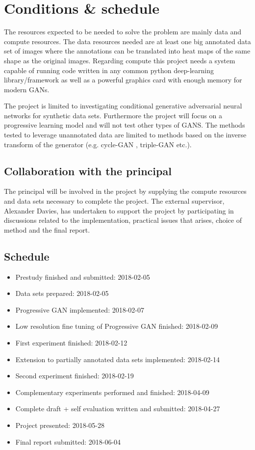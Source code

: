 \documentclass[a4paper]{article}
\begin{document}
\section{Conditions \& schedule}
The resources expected to be needed to solve the problem are mainly data and
compute resources.  The data resources needed
are at least one big annotated data set of images where the annotations can be
translated into heat maps of the same shape as the original images.
 Regarding compute this project needs a
system capable of running code written in any common python deep-learning library/framework as well as a powerful graphics card with enough memory for modern GANs.

The project is limited to investigating conditional generative adversarial neural networks for synthetic data sets. Furthermore the project will focus on a progressive learning model and will not test other types of GANS. The methods tested to leverage unannotated data are limited to methods based on the inverse transform of the generator (e.g. cycle-GAN \cite{zhu2017unpaired}, triple-GAN\cite{li2017triple} etc.). 

\subsection{Collaboration with the principal}
The principal will be involved in the project by supplying the
 compute resources and data sets necessary to complete the
project.
The external supervisor, Alexander Davies, has undertaken to support the project by participating in discussions related to the implementation, practical issues that arises, choice of method and the final report.

\subsection{Schedule}
\begin{itemize}
\item Prestudy finished and submitted: 2018-02-05
\item Data sets prepared: 2018-02-05
\item Progressive GAN implemented: 2018-02-07
\item Low resolution fine tuning of Progressive GAN finished: 2018-02-09
\item First experiment finished: 2018-02-12 
\item Extension to partially annotated data sets implemented: 2018-02-14
\item Second experiment finished: 2018-02-19
\item Complementary experiments performed and finished: 2018-04-09
\item Complete draft + self evaluation written and submitted: 2018-04-27
\item Project presented: 2018-05-28
\item Final report submitted: 2018-06-04
\end{itemize}



\end{document}
